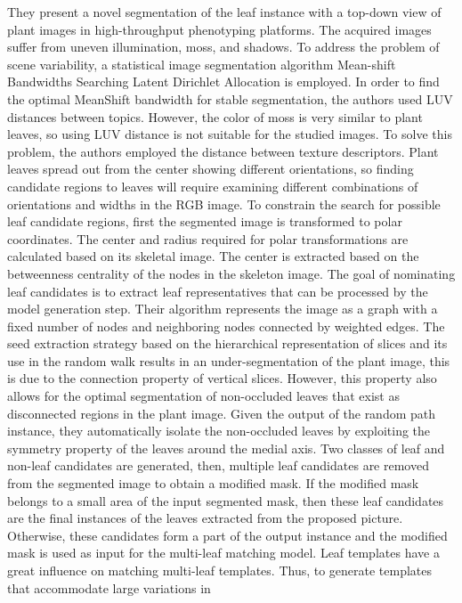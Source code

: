 They present a novel segmentation of the leaf instance with a top-down view of plant images in high-throughput phenotyping platforms.
The acquired images suffer from uneven illumination, moss, and shadows. To address the problem of scene variability, a statistical
image segmentation algorithm Mean-shift Bandwidths Searching Latent Dirichlet Allocation is employed. In order to find the optimal
MeanShift bandwidth for stable segmentation, the authors used LUV distances between topics. However, the color of moss is very similar
to plant leaves, so using LUV distance is not suitable for the studied images. To solve this problem, the authors employed the distance between
texture descriptors.
Plant leaves spread out from the center showing different orientations, so finding candidate regions to leaves will require examining different
combinations of orientations and widths in the RGB image. To constrain the search for possible leaf candidate regions, first the segmented image
is transformed to polar coordinates. The center and radius required for polar transformations are calculated based on its skeletal image. The center
is extracted based on the betweenness centrality of the nodes in the skeleton image. The goal of nominating leaf candidates is to extract leaf representatives
that can be processed by the model generation step. Their algorithm represents the image as a graph with a fixed number of nodes and neighboring nodes
connected by weighted edges. The seed extraction strategy based on the hierarchical representation of slices and its use in the random walk results in
an under-segmentation of the plant image, this is due to the connection property of vertical slices. However, this property also allows for the optimal
segmentation of non-occluded leaves that exist as disconnected regions in the plant image. Given the output of the random path instance, they automatically
isolate the non-occluded leaves by exploiting the symmetry property of the leaves around the medial axis. Two classes of leaf and non-leaf candidates are
generated, then, multiple leaf candidates are removed from the segmented image to obtain a modified mask. If the modified mask belongs to a small area of
the input segmented mask, then these leaf candidates are the final instances of the leaves extracted from the proposed picture. Otherwise, these candidates
form a part of the output instance and the modified mask is used as input for the multi-leaf matching model.
Leaf templates have a great influence on matching multi-leaf templates. Thus, to generate templates that accommodate large variations in
